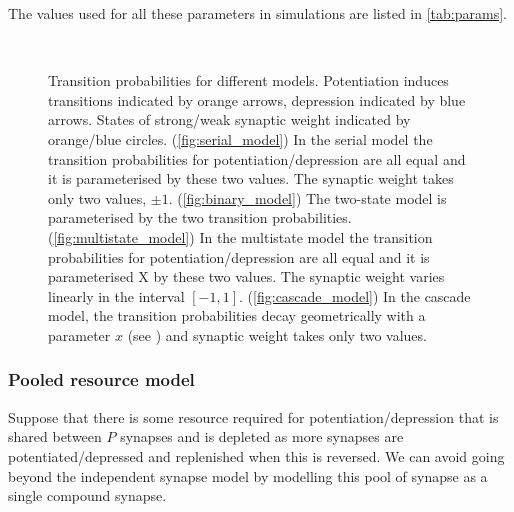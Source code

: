 \documentclass[12pt]{article}
\begin{document}
The values used for all these parameters in simulations are listed in \autoref{tab:params}.

\begin{figure}
 \begin{center}
 \parbox{0.8\linewidth}{%
 \begin{myenuma}
  \item{}\label{fig:serial_model}\hspace{0.5cm}
  \item{}\label{fig:binary_model}\hspace{0.5cm}\\[1cm]
  \item{}\label{fig:multistate_model}\hspace{0.5cm}
  \item{}\label{fig:cascade_model}
 \end{myenuma}
 }
 \end{center}
  \caption[Transition probabilities for different models]{Transition probabilities for different models.
  Potentiation induces transitions indicated by orange arrows, depression indicated by blue arrows.
  States of strong/weak synaptic weight indicated by orange/blue circles.
  (\ref{fig:serial_model}) In the serial model the transition probabilities for potentiation/depression are all equal and it is parameterised by these two values.
  The synaptic weight takes only two values, $\pm1$.
  (\ref{fig:binary_model}) The two-state model is parameterised by the two transition probabilities.
  (\ref{fig:multistate_model}) In the multistate model the transition probabilities for potentiation/depression are all equal and it is parameterised X
  by these two values.
  The synaptic weight varies linearly in the interval $[-1,1]$.
  (\ref{fig:cascade_model}) In the cascade model, the transition probabilities decay geometrically with a parameter $x$ (see \cite{Fusi2005cascade}) and synaptic weight takes only two values.
  } \label{fig:models}
\end{figure}

\subsubsection{Pooled resource model}\label{sec:pooledmodel}

Suppose that there is some resource required for potentiation/depression that is shared between $P$ synapses and is depleted as more synapses are potentiated/depressed and replenished when this is reversed.
We can avoid going beyond the independent synapse model by modelling this pool of synapse as a single compound synapse.
\end{document}

